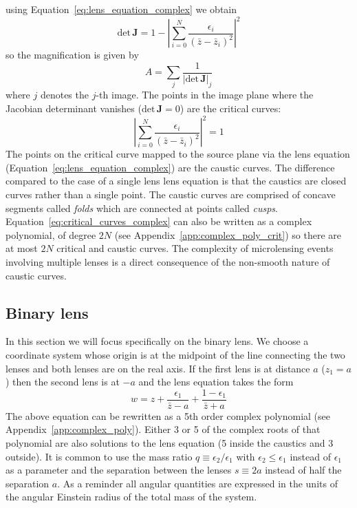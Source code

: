 \documentclass[12pt]{report}
\begin{document}
using Equation~\ref{eq:lens_equation_complex} we obtain
\begin{equation}
    \mathrm{det} \,\mathbf J=1-\left|\sum_{i=0}^{N} \frac{\epsilon_{i}}{\left(\bar{z}-\bar{z}_i\right)^{2}}\right|^{2}
\end{equation}
so the magnification is given by
\begin{equation}
    A = \sum_j \frac{1}{\left|\mathrm{det}\,\mathbf J\right|_j}
\end{equation}
where $j$ denotes the $j$-th image. The points in the image plane where the Jacobian determinant vanishes
($\mathrm{det}\,\mathbf J=0$) are the critical curves:
\begin{equation}
    \left|\sum_{i=0}^{N} \frac{\epsilon_{i}}{\left(\bar{z}-\bar{z}_i\right)^{2}}\right|^{2}=1
    \label{eq:critical_curves_complex}
\end{equation}
The points on the critical curve mapped to the source plane via
the lens equation (Equation~\ref{eq:lens_equation_complex}) are the caustic curves.
The difference compared to the case of a single lens lens equation is that the caustics are closed curves
rather than a single point. The caustic curves are comprised of concave segments called \emph{folds} which are connected
at points called \emph{cusps}.
Equation~\ref{eq:critical_curves_complex} can also be written as a complex polynomial, of
degree $2N$ (see Appendix~\ref{app:complex_poly_crit}) so there are at most $2N$ critical and caustic curves.
The complexity of microlensing events involving multiple lenses is a direct consequence of the
non-smooth nature of caustic curves.

\subsection{Binary lens}
In this section we will focus specifically on the binary lens. We choose a
coordinate system whose origin is at the midpoint of the line connecting the
two lenses and both lenses are on the real axis. If the first lens is at
distance $a$ ($z_1=a$) then the second lens is at $-a$ and the lens equation
takes the form
\begin{equation}
    w=z+\frac{\epsilon_{1}}{\bar{z} - a}+\frac{1 - \epsilon_{1}}{\bar{z} + a}
\end{equation}
The above equation can be rewritten as a 5th order complex polynomial
(see Appendix~\ref{app:complex_poly}). Either 3 or 5 of the complex roots of that
polynomial are also solutions to the lens equation
(5 inside the caustics and 3 outside).
It is common to use the mass ratio $q\equiv \epsilon_2/\epsilon_1$ with
$\epsilon_2 \leq \epsilon_1$ instead  of $\epsilon_1$ as a parameter and the
separation between the lenses $s\equiv 2a$ instead of half the separation $a$.
As a reminder all angular quantities are expressed in the units of the angular Einstein
radius of the total mass of the system.
\end{document}
